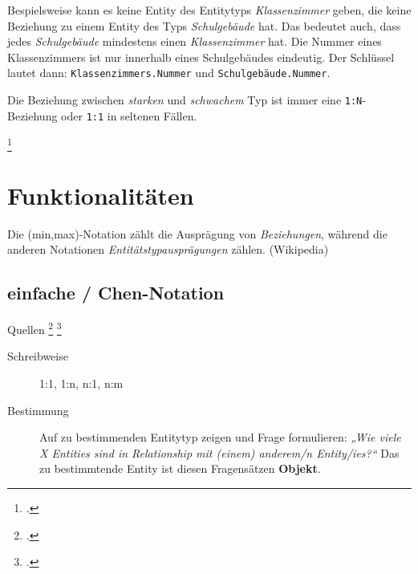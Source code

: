 \documentclass{lehramt-informatik-haupt}
\begin{document}
Bespielsweise  kann es keine Entity des Entitytyps \emph{Klassenzimmer}
geben, die keine Beziehung zu einem Entity des Typs \emph{Schulgebäude}
hat. Das bedeutet auch, dass jedes \emph{Schulgebäude} mindestens einen
\emph{Klassenzimmer} hat. Die Nummer eines Klassenzimmers ist nur
innerhalb eines Schulgebäudes eindeutig. Der Schlüssel lautet dann:
\texttt{Klassenzimmers.Nummer} und \texttt{Schulgebäude.Nummer}.

Die Beziehung zwischen \emph{starken} und \emph{schwachem} Typ ist immer
eine \texttt{1:N}-Bezieh\-ung oder \texttt{1:1} in seltenen Fällen.

\footcite[Seite 26]{db:fs:1}

\begin{center}
\end{center}

%

\section{Funktionalitäten}

Die (min,max)-Notation zählt die Ausprägung von \emph{Beziehungen},
während die anderen Notationen \emph{Entitätstypausprägungen} zählen.
(Wikipedia)

\subsection{einfache / Chen-Notation}

Quellen
\footcite[2.7.1 Seite 41]{kemper}
\footcite[Seite 59]{brinda}

\begin{description}
\item[Schreibweise] 1:1, 1:n, n:1, n:m
\item[Bestimmung]

Auf zu bestimmenden Entitytyp zeigen und Frage formulieren:
%
\emph{„Wie viele X Entities sind in Relationship mit (einem) anderem/n
Entity/ies?“}
%
Das zu bestimmtende Entity ist diesen Fragensätzen \textbf{Objekt}.

\end{description}
\end{document}
